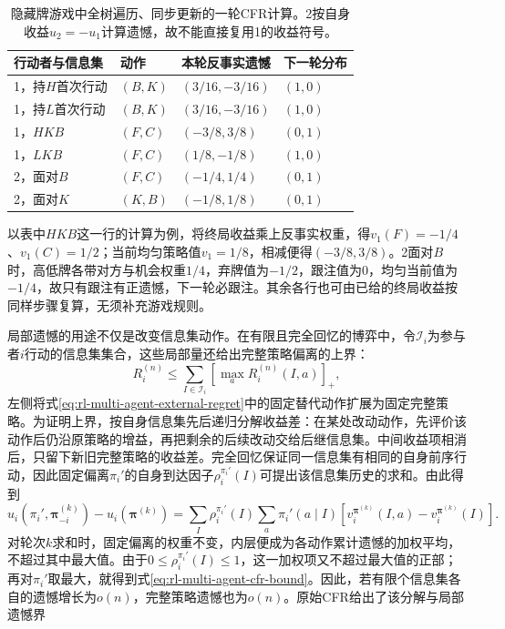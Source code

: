 \begin{table}[htbp]
 \centering
 \begin{tabular}{@{}llll@{}}
 \toprule
 行动者与信息集 & 动作 & 本轮反事实遗憾 & 下一轮分布\\
 \midrule
 1，持$H$首次行动 & $(B,K)$ & $(3/16,-3/16)$ & $(1,0)$\\
 1，持$L$首次行动 & $(B,K)$ & $(3/16,-3/16)$ & $(1,0)$\\
 1，$HKB$ & $(F,C)$ & $(-3/8,3/8)$ & $(0,1)$\\
 1，$LKB$ & $(F,C)$ & $(1/8,-1/8)$ & $(1,0)$\\
 2，面对$B$ & $(F,C)$ & $(-1/4,1/4)$ & $(0,1)$\\
 2，面对$K$ & $(K,B)$ & $(-1/8,1/8)$ & $(0,1)$\\
 \bottomrule
 \end{tabular}
 \caption{隐藏牌游戏中全树遍历、同步更新的一轮CFR计算。2按自身收益$u_2=-u_1$计算遗憾，故不能直接复用1的收益符号。}
 \label{tab:rl-multi-agent-cfr-round}
\end{table}

以表中$HKB$这一行的计算为例，将终局收益乘上反事实权重，得$v_1(F)=-1/4$、$v_1(C)=1/2$；当前均匀策略值$v_1=1/8$，相减便得$(-3/8,3/8)$。2面对$B$时，高低牌各带对方与机会权重$1/4$，弃牌值为$-1/2$，跟注值为0，均匀当前值为$-1/4$，故只有跟注有正遗憾，下一轮必跟注。其余各行也可由已给的终局收益按同样步骤复算，无须补充游戏规则。

局部遗憾的用途不仅是改变信息集动作。在有限且完全回忆的博弈中，令$\mathcal I_i$为参与者$i$行动的信息集集合，这些局部量还给出完整策略偏离的上界：
\begin{equation}
 R_i^{(n)}
 \leq\sum_{I\in\mathcal I_i}
        \left[\max_a R_i^{(n)}(I,a)\right]_+,
 \label{eq:rl-multi-agent-cfr-bound}
\end{equation}
左侧将式\eqref{eq:rl-multi-agent-external-regret}中的固定替代动作扩展为固定完整策略。为证明上界，按自身信息集先后递归分解收益差：在某处改动动作，先评价该动作后仍沿原策略的增益，再把剩余的后续改动交给后继信息集。中间收益项相消后，只留下新旧完整策略的收益差。完全回忆保证同一信息集有相同的自身前序行动，因此固定偏离$\pi_i'$的自身到达因子$\rho_i^{\pi_i'}(I)$可提出该信息集历史的求和。由此得到
\[
 u_i(\pi_i',\bm\pi_{-i}^{(k)})-u_i(\bm\pi^{(k)})
 =\sum_I\rho_i^{\pi_i'}(I)
       \sum_a\pi_i'(a\mid I)
       [v_i^{\bm\pi^{(k)}}(I,a)-v_i^{\bm\pi^{(k)}}(I)].
\]
对轮次$k$求和时，固定偏离的权重不变，内层便成为各动作累计遗憾的加权平均，不超过其中最大值。由于$0\leq\rho_i^{\pi_i'}(I)\leq1$，这一加权项又不超过最大值的正部；再对$\pi_i'$取最大，就得到式\eqref{eq:rl-multi-agent-cfr-bound}。因此，若有限个信息集各自的遗憾增长为$o(n)$，完整策略遗憾也为$o(n)$。原始CFR给出了该分解与局部遗憾界

